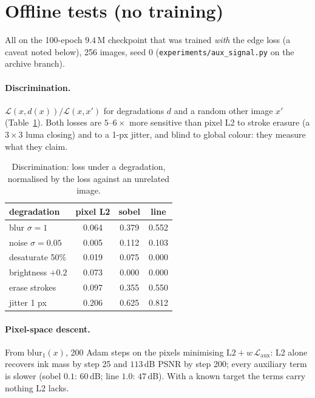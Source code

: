 \documentclass[11pt]{article}
\begin{document}
\section{Offline tests (no training)}\label{sec:offline}

All on the 100-epoch $9.4$\,M checkpoint that was trained \emph{with} the edge loss
(a caveat noted below), 256 images, seed 0 (\texttt{experiments/aux\_signal.py} on the
archive branch).

\paragraph{Discrimination.} $\mathcal L(x,d(x))/\mathcal L(x,x')$ for degradations $d$
and a random other image $x'$ (Table~\ref{tab:disc}). Both losses are $5$--$6\times$ more
sensitive than pixel L2 to stroke erasure (a $3\times3$ luma closing) and to a 1-px
jitter, and blind to global colour: they measure what they claim.

\begin{table}[t]
\centering\small
\caption{Discrimination: loss under a degradation, normalised by the loss against an
unrelated image.}
\label{tab:disc}
\begin{tabular}{lccc}
\toprule
degradation & pixel L2 & sobel & line \\
\midrule
blur $\sigma=1$ & 0.064 & 0.379 & 0.552 \\
noise $\sigma=0.05$ & 0.005 & 0.112 & 0.103 \\
desaturate 50\% & 0.019 & 0.075 & 0.000 \\
brightness $+0.2$ & 0.073 & 0.000 & 0.000 \\
erase strokes & 0.097 & 0.355 & 0.550 \\
jitter 1 px & 0.206 & 0.625 & 0.812 \\
\bottomrule
\end{tabular}
\end{table}

\paragraph{Pixel-space descent.} From $\text{blur}_1(x)$, 200 Adam steps on the pixels
minimising $\text{L2}+w\,\mathcal L_{\text{aux}}$: L2 alone recovers ink mass by step 25
and $113$\,dB PSNR by step 200; every auxiliary term is slower (sobel $0.1$: $60$\,dB;
line $1.0$: $47$\,dB). With a known target the terms carry nothing L2 lacks.
\end{document}
